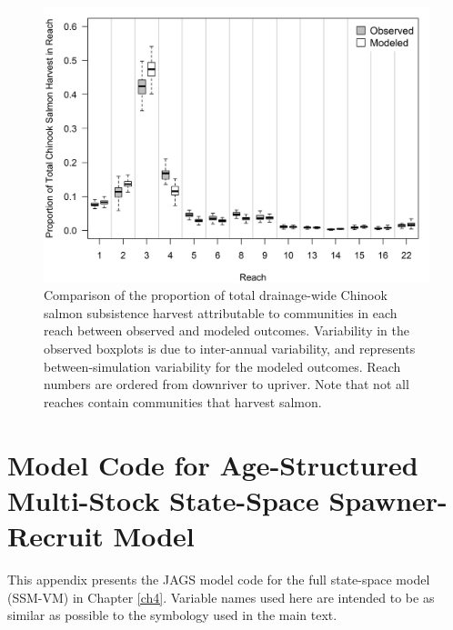 \documentclass[12pt,]{book}
\theoremstyle{definition}
\theoremstyle{definition}
\theoremstyle{definition}
\theoremstyle{remark}
\begin{document}
\clearpage

\begin{figure}
  \centering
  \includegraphics{img/Ch3/Figure B4.jpg}
  \caption{Comparison of the proportion of total drainage-wide Chinook salmon subsistence harvest attributable to communities in each reach between observed and modeled outcomes. Variability in the observed boxplots is due to inter-annual variability, and represents between-simulation variability for the modeled outcomes. Reach numbers are ordered from downriver to upriver. Note that not all reaches contain communities that harvest salmon.}
  \label{fig:spatial-harvest}
\end{figure}

\chapter{Model Code for Age-Structured Multi-Stock State-Space
Spawner-Recruit Model}\label{appendix-c}

\noindent
This appendix presents the JAGS model code for the full state-space
model (SSM-VM) in Chapter \ref{ch4}. Variable names used here are
intended to be as similar as possible to the symbology used in the main
text.

\singlespacing
\end{document}
